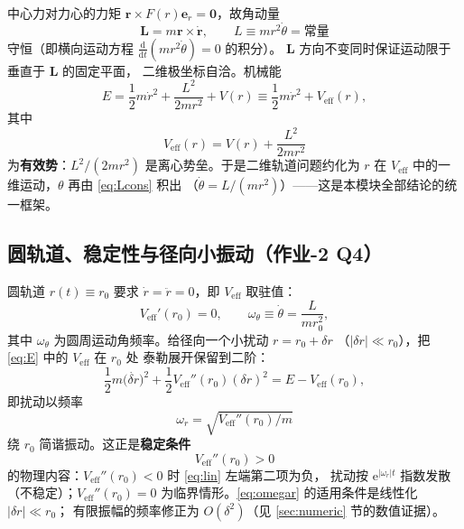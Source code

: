 \documentclass[UTF8,a4paper,11pt]{ctexart}
\begin{document}
中心力对力心的力矩 $\boldsymbol{r}\times F(r)\boldsymbol{e}_r=\boldsymbol{0}$，故角动量
\begin{equation}
  \boldsymbol{L}=m\boldsymbol{r}\times\dot{\boldsymbol{r}},\qquad
  L\equiv m r^2\dot\theta=\text{常量}
  \label{eq:Lcons}
\end{equation}
守恒（即横向运动方程 $\frac{\mathrm{d}}{\mathrm{d}t}(mr^2\dot\theta)=0$ 的积分）。
$\boldsymbol{L}$ 方向不变同时保证运动限于垂直于 $\boldsymbol{L}$ 的固定平面，
二维极坐标自洽。机械能
\begin{equation}
  E=\frac12m\dot r^2+\frac{L^2}{2mr^2}+V(r)
    \equiv \frac12m\dot r^2+V_{\mathrm{eff}}(r),
  \label{eq:E}
\end{equation}
其中
\begin{equation}
  \boxed{\;V_{\mathrm{eff}}(r)=V(r)+\frac{L^2}{2mr^2}\;}
  \label{eq:Veff}
\end{equation}
为\textbf{有效势}：$L^2/(2mr^2)$ 是离心势垒。于是二维轨道问题约化为
$r$ 在 $V_{\mathrm{eff}}$ 中的一维运动，$\theta$ 再由 \eqref{eq:Lcons} 积出
（$\dot\theta=L/(mr^2)$）——这是本模块全部结论的统一框架。

\subsection{圆轨道、稳定性与径向小振动（作业-2 Q4）}
\label{sub:circular}

圆轨道 $r(t)\equiv r_0$ 要求 $\dot r=\ddot r=0$，即 $V_{\mathrm{eff}}$ 取驻值：
\begin{equation}
  V_{\mathrm{eff}}'(r_0)=0,
  \qquad
  \omega_\theta\equiv\dot\theta=\frac{L}{mr_0^2},
  \label{eq:circcond}
\end{equation}
其中 $\omega_\theta$ 为圆周运动角频率。给径向一个小扰动 $r=r_0+\delta r$
（$|\delta r|\ll r_0$），把 \eqref{eq:E} 中的 $V_{\mathrm{eff}}$ 在 $r_0$ 处
泰勒展开保留到二阶：
\begin{equation}
  \frac12m\bigl(\dot{\delta r}\bigr)^2
  +\frac12V_{\mathrm{eff}}''(r_0)(\delta r)^2
  =E-V_{\mathrm{eff}}(r_0),
  \label{eq:lin}
\end{equation}
即扰动以频率
\begin{equation}
  \boxed{\;\omega_r=\sqrt{V_{\mathrm{eff}}''(r_0)/m}\;}
  \label{eq:omegar}
\end{equation}
绕 $r_0$ 简谐振动。这正是\textbf{稳定条件}
\begin{equation}
  V_{\mathrm{eff}}''(r_0)>0
  \label{eq:stabcond}
\end{equation}
的物理内容：$V_{\mathrm{eff}}''(r_0)<0$ 时 \eqref{eq:lin} 左端第二项为负，
扰动按 $\mathrm{e}^{|\omega_r|t}$ 指数发散（不稳定）；$V_{\mathrm{eff}}''(r_0)=0$
为临界情形。\eqref{eq:omegar} 的适用条件是线性化 $|\delta r|\ll r_0$；
有限振幅的频率修正为 $O(\delta^2)$（见 \ref{sec:numeric} 节的数值证据）。
\end{document}

